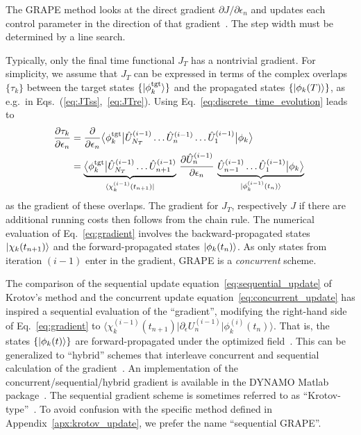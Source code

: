 \documentclass[submission, Phys]{SciPost}
\newcommand{\tgt}[0]{\text{tgt}}
\newcommand{\Op}[1]{\hat{#1}}
\begin{document}
The GRAPE method looks at the direct gradient $\partial J/\partial \epsilon_n$
and updates each control parameter in the direction of that
gradient~\cite{KhanejaJMR05}.
The step width must be determined by a line search.

Typically, only the final time functional $J_T$ has a nontrivial gradient.
For simplicity, we assume that $J_T$ can be expressed in terms of
the complex overlaps $\{\tau_k\}$ between the target states
\(\{\ket{\phi_k^{\tgt}}\}\) and the propagated states
\(\{\ket{\phi_k(T)}\}\), as e.g.\ in Eqs.~(\ref{eq:JTss},~\ref{eq:JTre}).
Using Eq.~\eqref{eq:discrete_time_evolution} leads to
\begin{equation}%
  \label{eq:gradient}
  \begin{split}
    \frac{\partial \tau_k}{\partial \epsilon_n} &= \frac{\partial}{\partial
    \epsilon_n} \big\langle \phi_k^{\tgt} \big\vert \Op{U}^{(i-1)}_{N_T} \dots
    \Op{U}^{(i-1)}_{n} \dots \Op{U}^{(i-1)}_{1} \big\vert \phi_k \big\rangle \\
    &=
        \underbrace{%
    \big\langle \phi_k^{\tgt} \big\vert
              \Op{U}^{(i-1)}_{N_T} \dots \Op{U}^{(i-1)}_{n+1}}_{%
    \bra{\chi^{(i-1)}_k(t_{n+1})} } \,
    \frac{\partial\Op{U}^{(i-1)}_{n}}{\partial\epsilon_n} \,
         \underbrace{%
    \Op{U}^{(i-1)}_{n-1} \dots \Op{U}^{(i-1)}_{1} \big\vert
            \phi_k \big\rangle}_{%
    \ket{\phi^{(i-1)}_k(t_n)} }\
  \end{split}
\end{equation}
as the gradient of these overlaps.
The gradient for $J_T$, respectively $J$ if there
are additional running costs then follows from the chain rule.
The numerical evaluation of Eq.~\eqref{eq:gradient} involves the
backward-propagated states \(\ket{\chi_k(t_{n+1})}\) and the
forward-propagated states \(\ket{\phi_k(t_n)}\).
As only states from iteration $(i-1)$ enter in the gradient, GRAPE is
a \emph{concurrent} scheme.

The comparison of the sequential update equation~\eqref{eq:sequential_update} of
Krotov's method and the concurrent update equation~\eqref{eq:concurrent_update}
has inspired a sequential evaluation of the ``gradient'', modifying the
right-hand side of Eq.~\eqref{eq:gradient} to $\langle \chi_k^{(i-1)}(t_{n+1})
\vert \partial_\epsilon U_n^{(i-1)} \vert \phi_k^{(i)}(t_n)\rangle$.
That is, the states $\{\ket{\phi_k(t)}\}$ are forward-propagated under the
optimized field~\cite{SchirmerJMO2009}.
This can be generalized to ``hybrid'' schemes that interleave concurrent and
sequential calculation of the gradient~\cite{MachnesPRA11}.
An implementation of the concurrent/sequential/hybrid gradient is available in
the DYNAMO Matlab package~\cite{MachnesPRA11}.
The sequential gradient scheme is sometimes referred to as
``Krotov-type''~\cite{MachnesPRA11, FloetherNJP12}.
To avoid confusion with the specific method defined in
Appendix~\ref{apx:krotov_update}, we prefer the name ``sequential GRAPE''.
\end{document}
